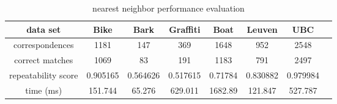 \begin{table}[H]
  \begin{tabular}{| c || c | c | c | c | c | c | c |}
      \hline
      data set & Bike & Bark & Graffiti & Boat & Leuven & UBC \\ \hline \hline
      correspondences & 1181 & 147 & 369 & 1648 & 952 & 2548 \\ \hline
      correct matches & 1069 & 83 & 191 & 1183 & 791 & 2497 \\ \hline
      repeatability score & 0.905165 & 0.564626 & 0.517615 & 0.71784 & 0.830882 & 0.979984\\ \hline
      time (ms) & 151.744 & 65.276 & 629.011 & 1682.89 & 121.847 & 527.787 \\ \hline
  \end{tabular}
  \caption{nearest neighbor performance evaluation} \label{tab:nearest_neighbor_matching_eval}
\end{table}

